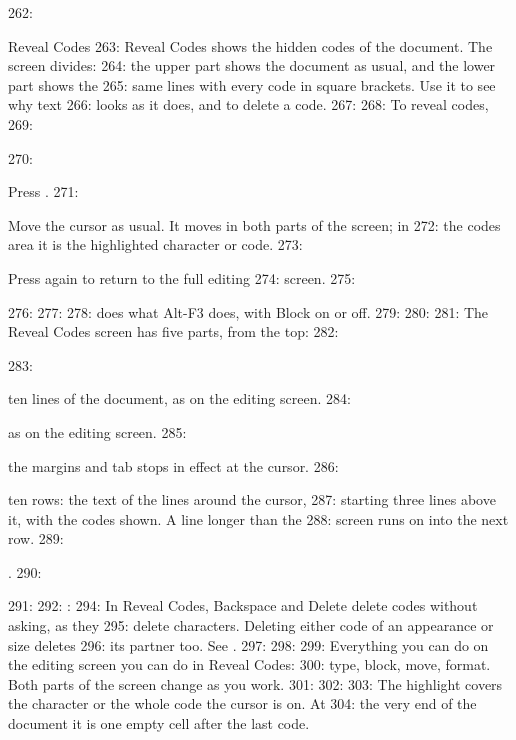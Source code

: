 262: \begin{Feature}{Reveal Codes}
263: Reveal Codes shows the hidden codes of the document.  The screen divides:
264: the upper part shows the document as usual, and the lower part shows the
265: same lines with every code in square brackets.  Use it to see why text
266: looks as it does, and to delete a code.
267: 
268: To reveal codes,
269: \begin{WPSteps}
270: \item Press .
271: \item Move the cursor as usual.  It moves in both parts of the screen; in
272: the codes area it is the highlighted character or code.
273: \item Press  again to return to the full editing
274: screen.
275: \end{WPSteps}
276: 
277: 
278:  does what Alt-F3 does, with Block on or off.
279: 
280: 
281: The Reveal Codes screen has five parts, from the top:
282: \begin{description}
283: \item[The document] ten lines of the document, as on the editing screen.
284: \item[The status line] as on the editing screen.
285: \item[The ruler] the margins and tab stops in effect at the cursor.
286: \item[The codes area] ten rows: the text of the lines around the cursor,
287: starting three lines above it, with the codes shown.  A line longer than the
288: screen runs on into the next row.
289: \item[The message] .
290: \end{description}
291: 
292: : 
294: In Reveal Codes, Backspace and Delete delete codes without asking, as they
295: delete characters.  Deleting either code of an appearance or size deletes
296: its partner too.  See .
297: 
298: 
299: Everything you can do on the editing screen you can do in Reveal Codes:
300: type, block, move, format.  Both parts of the screen change as you work.
301: 
302: 
303: The highlight covers the character or the whole code the cursor is on.  At
304: the very end of the document it is one empty cell after the last code.

\end{Feature}

